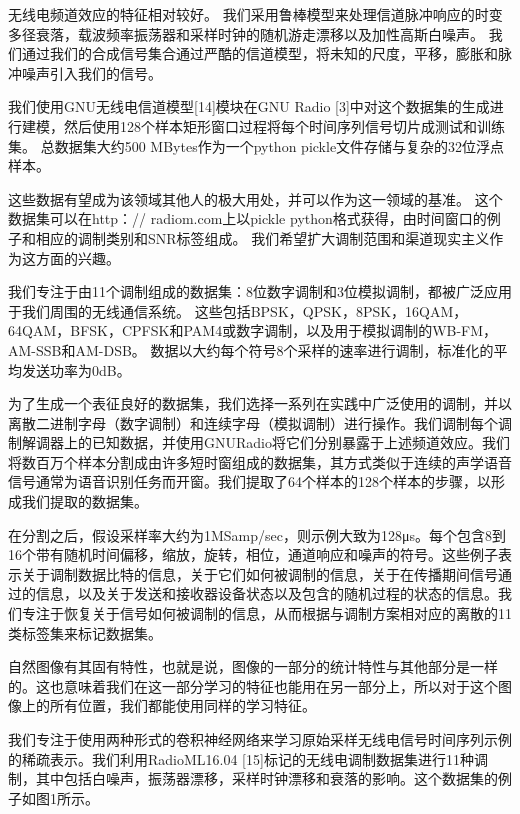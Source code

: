 无线电频道效应的特征相对较好。 我们采用鲁棒模型来处理信道脉冲响应的时变多径衰落，载波频率振荡器和采样时钟的随机游走漂移以及加性高斯白噪声。 我们通过我们的合成信号集合通过严酷的信道模型，将未知的尺度，平移，膨胀和脉冲噪声引入我们的信号。\par

我们使用GNU无线电信道模型[14]模块在GNU Radio [3]中对这个数据集的生成进行建模，然后使用128个样本矩形窗口过程将每个时间序列信号切片成测试和训练集。 总数据集大约500 MBytes作为一个python pickle文件存储与复杂的32位浮点样本。\par

这些数据有望成为该领域其他人的极大用处，并可以作为这一领域的基准。 这个数据集可以在http：// radiom.com上以pickle python格式获得，由时间窗口的例子和相应的调制类别和SNR标签组成。 我们希望扩大调制范围和渠道现实主义作为这方面的兴趣。\par

我们专注于由11个调制组成的数据集：8位数字调制和3位模拟调制，都被广泛应用于我们周围的无线通信系统。 这些包括BPSK，QPSK，8PSK，16QAM，64QAM，BFSK，CPFSK和PAM4或数字调制，以及用于模拟调制的WB-FM，AM-SSB和AM-DSB。 数据以大约每个符号8个采样的速率进行调制，标准化的平均发送功率为0dB。\par

为了生成一个表征良好的数据集，我们选择一系列在实践中广泛使用的调制，并以离散二进制字母（数字调制）和连续字母（模拟调制）进行操作。我们调制每个调制解调器上的已知数据，并使用GNURadio将它们分别暴露于上述频道效应。我们将数百万个样本分割成由许多短时窗组成的数据集，其方式类似于连续的声学语音信号通常为语音识别任务而开窗。我们提取了64个样本的128个样本的步骤，以形成我们提取的数据集。\par

在分割之后，假设采样率大约为1MSamp/sec，则示例大致为128μs。每个包含8到16个带有随机时间偏移，缩放，旋转，相位，通道响应和噪声的符号。这些例子表示关于调制数据比特的信息，关于它们如何被调制的信息，关于在传播期间信号通过的信息，以及关于发送和接收器设备状态以及包含的随机过程的状态的信息。我们专注于恢复关于信号如何被调制的信息，从而根据与调制方案相对应的离散的11类标签集来标记数据集。\par


自然图像有其固有特性，也就是说，图像的一部分的统计特性与其他部分是一样的。这也意味着我们在这一部分学习的特征也能用在另一部分上，所以对于这个图像上的所有位置，我们都能使用同样的学习特征。\par

我们专注于使用两种形式的卷积神经网络来学习原始采样无线电信号时间序列示例的稀疏表示。我们利用RadioML16.04 [15]标记的无线电调制数据集进行11种调制，其中包括白噪声，振荡器漂移，采样时钟漂移和衰落的影响。这个数据集的例子如图1所示。\par


